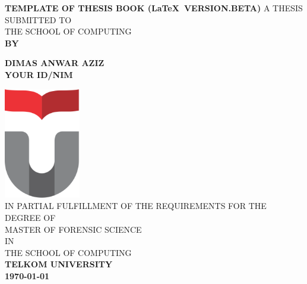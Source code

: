 \begin{titlepage}
\begin{center}
	\LARGE %
    {\sf\singlespacing 
		\textbf{TEMPLATE OF THESIS BOOK (\LaTeX~VERSION.BETA)}
	}
    \vfill
	\vfill
    \large
    { 
    	A THESIS SUBMITTED TO\\[0.2cm]
    	THE SCHOOL OF COMPUTING\\     
    }
	\vfill
    \sf\textbf{BY\\[0.5cm]}\par
    \large
    \textbf{DIMAS ANWAR AZIZ\\[0.5cm]YOUR ID/NIM}\par
    \vfill
    \includegraphics[width=0.25\textwidth]{logo/TelkomUniversity}\\[1.5cm] 
    \vfill 
    \normalfont\large
    { 
		IN PARTIAL FULFILLMENT OF THE REQUIREMENTS FOR THE DEGREE OF\\
        MASTER OF FORENSIC SCIENCE\\
        IN\\
        THE SCHOOL OF COMPUTING\\
    }    
    \vfill
    \Large
	\sf\textbf{TELKOM UNIVERSITY}\\
	\sf\textbf{\myyear \today}
\end{center}
\end{titlepage}


